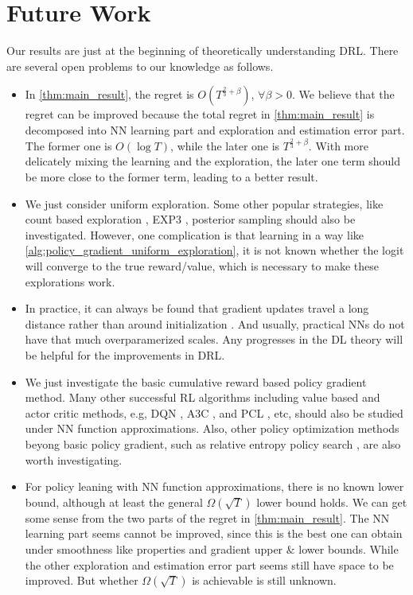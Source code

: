 \section{Future Work}
\label{sec:future_work}

Our results are just at the beginning of theoretically understanding DRL. There are several open problems to our knowledge as follows.
\begin{itemize}
    \item In \cref{thm:main_result}, the regret is $O\left( T^{\frac{2}{3} + \beta}\right)$, $\forall \beta > 0$. We believe that the regret can be improved because the total regret in \cref{thm:main_result} is decomposed into NN learning part and exploration and estimation error part. The former one is $O\left(\log{T}\right)$, while the later one is $T^{\frac{2}{3} + \beta}$. With more delicately mixing the learning and the exploration, the later one term should be more close to the former term, leading to a better result.
    \item We just consider uniform exploration. Some other popular strategies, like count based exploration \cite{auer2002finite}, EXP3 \citep{seldin2014one}, posterior sampling \citep{agrawal2012analysis} should also be investigated. However, one complication is that learning in a way like \cref{alg:policy_gradient_uniform_exploration}, it is not known whether the logit will converge to the true reward/value, which is necessary to make these explorations work.
    \item In practice, it can always be found that gradient updates travel a long distance rather than around initialization \citep{liu2018deeptracker}. And usually, practical NNs do not have that much overparamerized scales. Any progresses in the DL theory will be helpful for the  improvements in DRL.
    \item We just investigate the basic cumulative reward based policy gradient method. Many other successful RL algorithms including value based and actor critic methods, e.g, DQN \cite{mnih2015human}, A3C \citep{mnih2016asynchronous}, and PCL \citep{nachum2017bridging}, etc, should also be studied under NN function approximations. Also, other policy optimization methods beyong basic policy gradient, such as relative entropy policy search \citep{peters2010relative}, are also worth investigating.
    \item For policy leaning with NN function approximations, there is no known lower bound, although at least the general $\Omega\left(\sqrt{T}\right)$ lower bound holds. We can get some sense from the two parts of the regret in \cref{thm:main_result}. The NN learning part seems cannot be improved, since this is the best one can obtain under smoothness like properties and gradient upper $\&$ lower bounds. While the other exploration and estimation error part seems still have space to be improved. But whether $\Omega\left(\sqrt{T}\right)$ is achievable is still unknown.
\end{itemize}

\nocite{langley00}
\fi